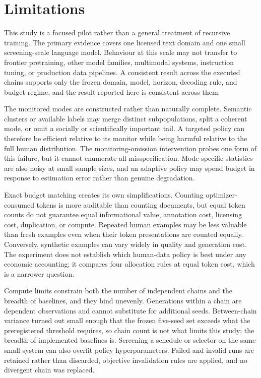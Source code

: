 \section{Limitations}

This study is a focused pilot rather than a general treatment of recursive training. The primary evidence covers one licensed text domain and one small screening-scale language model. Behaviour at this scale may not transfer to frontier pretraining, other model families, multimodal systems, instruction tuning, or production data pipelines. A consistent result across the executed chains supports only the frozen domain, model, horizon, decoding rule, and budget regime, and the result reported here is consistent across them.

The monitored modes are constructed rather than naturally complete. Semantic clusters or available labels may merge distinct subpopulations, split a coherent mode, or omit a socially or scientifically important tail. A targeted policy can therefore be efficient relative to its monitor while being harmful relative to the full human distribution. The monitoring-omission intervention probes one form of this failure, but it cannot enumerate all misspecification. Mode-specific statistics are also noisy at small sample sizes, and an adaptive policy may spend budget in response to estimation error rather than genuine degradation.

Exact budget matching creates its own simplifications. Counting optimizer-consumed tokens is more auditable than counting documents, but equal token counts do not guarantee equal informational value, annotation cost, licensing cost, duplication, or compute. Repeated human examples may be less valuable than fresh examples even when their token presentations are counted equally. Conversely, synthetic examples can vary widely in quality and generation cost. The experiment does not establish which human-data policy is best under any economic accounting; it compares four allocation rules at equal token cost, which is a narrower question.

Compute limits constrain both the number of independent chains and the breadth of baselines, and they bind unevenly. Generations within a chain are dependent observations and cannot substitute for additional seeds. Between-chain variance turned out small enough that the frozen five-seed set exceeds what the preregistered threshold requires, so chain count is not what limits this study; the breadth of implemented baselines is. Screening a schedule or selector on the same small system can also overfit policy hyperparameters. Failed and invalid runs are retained rather than discarded, objective invalidation rules are applied, and no divergent chain was replaced.

